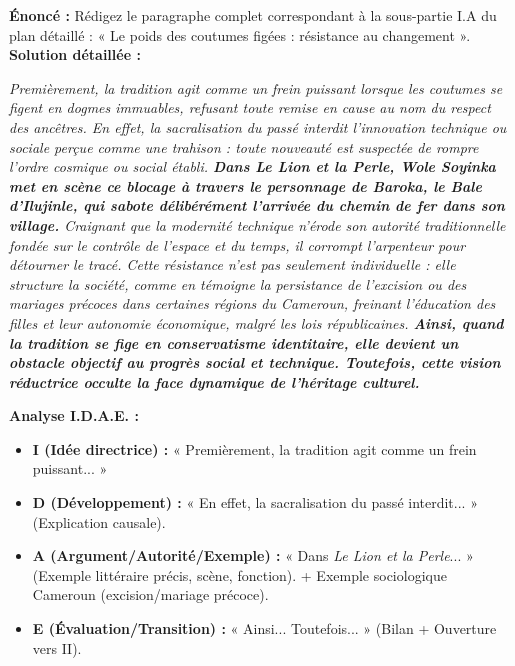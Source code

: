 \documentclass[11pt]{article}
\newcounter{popsec}
\newcounter{popsub}
\newcommand{\courssub}[1]{%
  \stepcounter{popsub}%
  \par\vspace{9pt}\noindent{\popxbold\fontsize{11.5}{13}\selectfont\color{popink}{\color{poporange}\thepopsec.\thepopsub}\hspace{6pt}#1}\par\nopagebreak\vspace{4pt}
}
\begin{document}
\begin{exoresolu}
\textbf{Énoncé :} Rédigez le paragraphe complet correspondant à la sous-partie I.A du plan détaillé : « Le poids des coutumes figées : résistance au changement ».
\tcblower
\textbf{Solution détaillée :}

\emph{Premièrement, la tradition agit comme un frein puissant lorsque les coutumes se figent en dogmes immuables, refusant toute remise en cause au nom du respect des ancêtres. En effet, la sacralisation du passé interdit l'innovation technique ou sociale perçue comme une trahison : toute nouveauté est suspectée de rompre l'ordre cosmique ou social établi. \textbf{Dans \emph{Le Lion et la Perle}, Wole Soyinka met en scène ce blocage à travers le personnage de Baroka, le Bale d'Ilujinle, qui sabote délibérément l'arrivée du chemin de fer dans son village.} Craignant que la modernité technique n'érode son autorité traditionnelle fondée sur le contrôle de l'espace et du temps, il corrompt l'arpenteur pour détourner le tracé. Cette résistance n'est pas seulement individuelle : elle structure la société, comme en témoigne la persistance de l'excision ou des mariages précoces dans certaines régions du Cameroun, freinant l'éducation des filles et leur autonomie économique, malgré les lois républicaines. \textbf{Ainsi, quand la tradition se fige en conservatisme identitaire, elle devient un obstacle objectif au progrès social et technique. Toutefois, cette vision réductrice occulte la face dynamique de l'héritage culturel.}}

\textbf{Analyse I.D.A.E. :}
\begin{itemize}
    \item \textbf{I (Idée directrice) :} « Premièrement, la tradition agit comme un frein puissant... »
    \item \textbf{D (Développement) :} « En effet, la sacralisation du passé interdit... » (Explication causale).
    \item \textbf{A (Argument/Autorité/Exemple) :} « Dans \emph{Le Lion et la Perle}... » (Exemple littéraire précis, scène, fonction). + Exemple sociologique Cameroun (excision/mariage précoce).
    \item \textbf{E (Évaluation/Transition) :} « Ainsi... Toutefois... » (Bilan + Ouverture vers II).
\end{itemize}
\end{exoresolu}

\courssub{Rédiger la conclusion}
\end{document}
